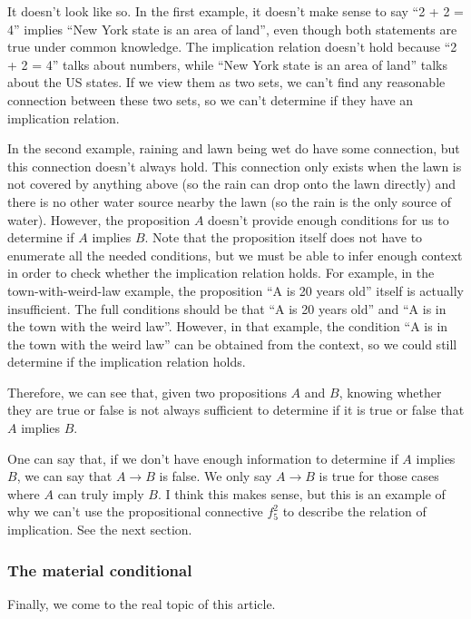 \documentclass[12pt, letterpaper]{article}
\begin{document}
It doesn't look like so. In the first example, it doesn't make sense to say
``2 + 2 = 4'' implies ``New York state is an area of land'', even though both
statements are true under common knowledge. The implication relation doesn't
hold because ``2 + 2 = 4'' talks about numbers, while ``New York state is an
area of land'' talks about the US states. If we view them as two sets, we can't
find any reasonable connection between these two sets, so we can't determine if
they have an implication relation.

In the second example, raining and lawn being wet do have some connection, but
this connection doesn't always hold. This connection only exists when the lawn
is not covered by anything above (so the rain can drop onto the lawn directly)
and there is no other water source nearby the lawn (so the rain is the only
source of water). However, the proposition $A$ doesn't provide enough conditions
for us to determine if $A$ implies $B$. Note that the proposition itself does
not have to enumerate all the needed conditions, but we must be able to infer
enough context in order to check whether the implication relation holds. For
example, in the town-with-weird-law example, the proposition ``A is 20 years
old'' itself is actually insufficient. The full conditions should be that ``A
is 20 years old'' and ``A is in the town with the weird law''. However, in that
example, the condition ``A is in the town with the weird law'' can be obtained
from the context, so we could still determine if the implication relation holds.

Therefore, we can see that, given two propositions $A$ and $B$, knowing whether
they are true or false is not always sufficient to determine if it is true or
false that $A$ implies $B$.

One can say that, if we don't have enough information to determine if $A$
implies $B$, we can say that $A \rightarrow B$ is false. We only say
$A \rightarrow B$ is true for those cases where $A$ can truly imply $B$. I
think this makes sense, but this is an example of why we can't use the
propositional connective $f_5^2$ to describe the relation of implication. See
the next section.

\subsubsection{The material conditional}

Finally, we come to the real topic of this article.
\end{document}
